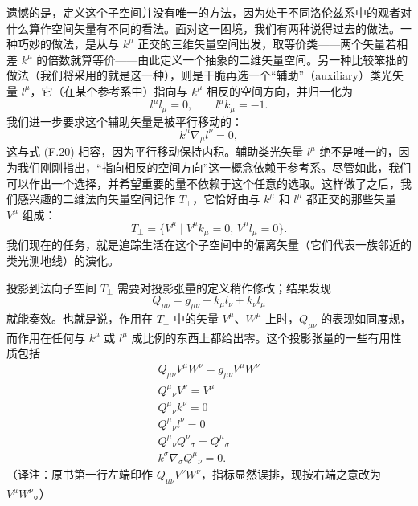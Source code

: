 遗憾的是，定义这个子空间并没有唯一的方法，因为处于不同洛伦兹系中的观者对什么算作空间矢量有不同的看法。面对这一困境，我们有两种说得过去的做法。一种巧妙的做法，是从与 $k^\mu$ 正交的三维矢量空间出发，取等价类——两个矢量若相差 $k^\mu$ 的倍数就算等价——由此定义一个抽象的二维矢量空间。另一种比较笨拙的做法（我们将采用的就是这一种），则是干脆再选一个“辅助”（auxiliary）类光矢量 $l^\mu$，它（在某个参考系中）指向与 $k^\mu$ 相反的空间方向，并归一化为
\begin{equation*}
l^\mu l_\mu = 0,\qquad l^\mu k_\mu = -1.
\tag{F.20}
\end{equation*}
我们进一步要求这个辅助矢量是被平行移动的：
\begin{equation*}
k^\mu\nabla_\mu l^\nu = 0,
\tag{F.21}
\end{equation*}
这与式 (F.20) 相容，因为平行移动保持内积。辅助类光矢量 $l^\mu$ 绝不是唯一的，因为我们刚刚指出，“指向相反的空间方向”这一概念依赖于参考系。尽管如此，我们可以作出一个选择，并希望重要的量不依赖于这个任意的选取。这样做了之后，我们感兴趣的二维法向矢量空间记作 $T_\perp$，它恰好由与 $k^\mu$ 和 $l^\mu$ 都正交的那些矢量 $V^\mu$ 组成：
\begin{equation*}
T_\perp = \{V^\mu \mid V^\mu k_\mu = 0,\, V^\mu l_\mu = 0\}.
\tag{F.22}
\end{equation*}
我们现在的任务，就是追踪生活在这个子空间中的偏离矢量（它们代表一族邻近的类光测地线）的演化。

投影到法向子空间 $T_\perp$ 需要对投影张量的定义稍作修改；结果发现
\begin{equation*}
Q_{\mu\nu} = g_{\mu\nu} + k_\mu l_\nu + k_\nu l_\mu
\tag{F.23}
\end{equation*}
就能奏效。也就是说，作用在 $T_\perp$ 中的矢量 $V^\mu$、$W^\mu$ 上时，$Q_{\mu\nu}$ 的表现如同度规，而作用在任何与 $k^\mu$ 或 $l^\mu$ 成比例的东西上都给出零。这个投影张量的一些有用性质包括
\begin{gather*}
Q_{\mu\nu}V^\mu W^\nu = g_{\mu\nu}V^\mu W^\nu \\
Q^\mu{}_\nu V^\nu = V^\mu \\
Q^\mu{}_\nu k^\nu = 0 \\
Q^\mu{}_\nu l^\nu = 0 \\
Q^\mu{}_\nu Q^\nu{}_\sigma = Q^\mu{}_\sigma \\
k^\sigma\nabla_\sigma Q^\mu{}_\nu = 0.
\tag{F.24}
\end{gather*}
（译注：原书第一行左端印作 $Q_{\mu\nu}V^\nu W^\nu$，指标显然误排，现按右端之意改为 $V^\mu W^\nu$。）

